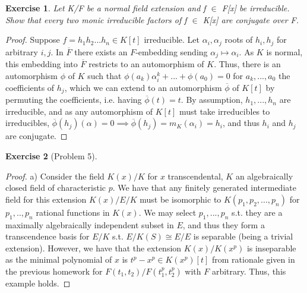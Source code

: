 \documentclass{article}
\newtheorem{exercise}{Exercise}
\begin{document}
\begin{exercise}
   Let K/F be a normal field extension and f $\in$ F[x] be irreducible.  Show that every two monic irreducible factors of f $\in$ K[x] are conjugate over F.
\end{exercise}

\begin{proof}
  Suppose $f = h_{1}h_{2}...h_{n} \in K[t]$ irreducible. Let $\alpha_{i}, \alpha_{j}$ roots of $h_{i}, h_{j}$ for arbitrary $i,j$. In $\overline F$ there exists an $F$-embedding sending $\alpha_{j} \mapsto \alpha_{i}$. As $K$ is normal, this embedding into $\overline F$ restricts to an automorphism of $K$. Thus, there is an automorphism $\phi$ of $K$ such that $\phi(a_{k})\alpha_{i}^{k}+...+\phi(a_{0}) = 0$ for $a_{k},...,a_{0}$ the coefficients of $h_{j}$, which we can extend to an automorphism $\overline \phi$ of $K[t]$ by permuting the coefficients, i.e. having $\overline \phi(t) = t$. By assumption, $h_{1},...,h_{n}$ are irreducible, and as any automorphism of $K[t]$ must take irreducibles to irreducibles, $\overline\phi(h_{j})(\alpha) = 0 \implies \overline\phi(h_{j}) = m_{K}(\alpha_{i}) = h_{i}$, and thus $h_{i}$ and $h_{j}$ are conjugate.
\end{proof}

\begin{exercise}[Problem 5]
\end{exercise}
\begin{proof}
  a) Consider the field $K(x)/K$ for $x$ transcendental, $K$ an algebraically closed field of characteristic $p$. We have that any finitely generated intermediate field for this extension $K(x)/E/K$ must be isomorphic to $K(p_{1},p_{2},...,p_{n})$ for $p_{1},..,p_{n}$ rational functions in $K(x)$. We may select $p_{1},...,p_{n}$ s.t. they are a maximally algebraically independent subset in $E$, and thus they form a transcendence basis for $E/K$ s.t. $E/K(S) \cong E/E$ is separable (being a trivial extension). However, we have that the extension $K(x)/K(x^{p})$ is inseparable as the minimal polynomial of $x$ is $t^{p}-x^{p} \in K(x^{p})[t]$ from rationale given in the previous homework for $F(t_{1},t_{2})/F(t_{1}^{p},t_{2}^{p})$ with $F$ arbitrary. Thus, this example holds. 
 
\end{proof}
\end{document}
